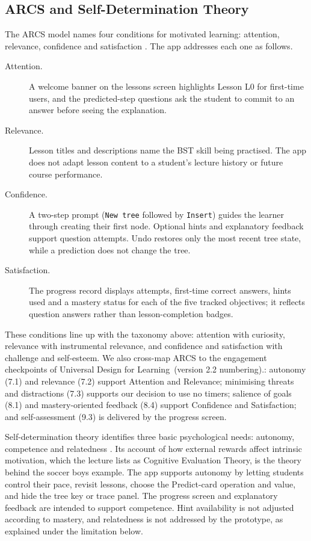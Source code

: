 \subsection{ARCS and Self-Determination Theory}\label{sec:id-arcs-sdt}
The ARCS model names four conditions for motivated learning: attention, relevance, confidence and satisfaction \cite{Keller2010}. The app addresses each one as follows.

\begin{description}
    \item[Attention.] A welcome banner on the lessons screen highlights Lesson L0 for first-time users, and the predicted-step questions ask the student to commit to an answer before seeing the explanation.
    \item[Relevance.] Lesson titles and descriptions name the BST skill being practised. The app does not adapt lesson content to a student's lecture history or future course performance.
    \item[Confidence.] A two-step prompt (\texttt{New tree} followed by \texttt{Insert}) guides the learner through creating their first node. Optional hints and explanatory feedback support question attempts. Undo restores only the most recent tree state, while a prediction does not change the tree.
    \item[Satisfaction.] The progress record displays attempts, first-time correct answers, hints used and a mastery status for each of the five tracked objectives; it reflects question answers rather than lesson-completion badges.
\end{description}

These conditions line up with the taxonomy above: attention with curiosity, relevance with instrumental relevance, and confidence and satisfaction with challenge and self-esteem. We also cross-map ARCS to the engagement checkpoints of Universal Design for Learning~\cite{CAST2018}(version 2.2 numbering).: autonomy (7.1) and relevance (7.2) support Attention and Relevance; minimising threats and distractions (7.3) supports our decision to use no timers; salience of goals (8.1) and mastery-oriented feedback (8.4) support Confidence and Satisfaction; and self-assessment (9.3) is delivered by the progress screen.

Self-determination theory identifies three basic psychological needs: autonomy, competence and relatedness \cite{Deci2000}. Its account of how external rewards affect intrinsic motivation, which the lecture lists as Cognitive Evaluation Theory, is the theory behind the soccer boys example. The app supports autonomy by letting students control their pace, revisit lessons, choose the Predict-card operation and value, and hide the tree key or trace panel. The progress screen and explanatory feedback are intended to support competence. Hint availability is not adjusted according to mastery, and relatedness is not addressed by the prototype, as explained under the limitation below.


